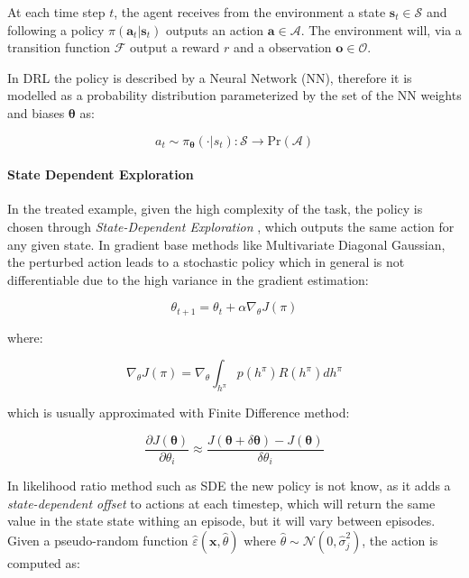 At each time step $t$, the agent receives from the environment a state $\mathbf{s}_t \in \mathcal{S}$ and following a policy $\pi (\mathbf{a}_t | \mathbf{s}_t)$ outputs an action $\mathbf{a} \in \mathcal{A}$. The environment will, via a transition function $\mathcal{F}$ output a reward $r$ and a observation $\mathbf{o} \in \mathcal{O}$.

In \ac{DRL} the policy is described by a Neural Network (\ac{NN}), therefore it is modelled as a probability distribution parameterized by the set of the \ac{NN} weights and biases $\boldsymbol{\theta}$ as:

\begin{equation}
    a _t \sim \pi _{\boldsymbol{\theta}}(\cdot | s_t): \mathcal{S} \rightarrow \mathrm{Pr}(\mathcal{A})
\end{equation}

\paragraph{State Dependent Exploration} In the treated example, given the high complexity of the task, the policy is chosen through \textit{State-Dependent Exploration} \cite{daelemans_state-dependent_2008} \cite{raffin_smooth_2021}, which outputs the same action for any given state. In gradient base methods like Multivariate Diagonal Gaussian, the perturbed action leads to a stochastic policy which in general is not differentiable due to the high variance in the gradient estimation:

\begin{equation}
    \theta _{t+1} = \theta _t + \alpha \nabla _{\theta} J(\pi)
\end{equation}

where:

\begin{equation}
    \nabla _{\theta} J(\pi) = \nabla _{\theta} \int _{h ^{\pi}} p(h ^{\pi})R(h ^{\pi})dh ^{\pi}
\end{equation}

which is usually approximated with Finite Difference method:

\begin{equation}
    \label{eqn:finitediff}
    \frac{\partial J(\boldsymbol{\theta})}{\partial \theta _i} \approx \frac{J(\boldsymbol{\theta} + \delta \boldsymbol{\theta}) - J(\boldsymbol{\theta})}{\delta \theta _i}
\end{equation}

In likelihood ratio method such as \ac{SDE} the new policy is not know, as it adds a \textit{state-dependent offset} to actions at each timestep, which will return the same value in the state state withing an episode, but it will vary between episodes. Given a pseudo-random function $\hat{\varepsilon}(\mathbf{x}, \hat{\theta})$ where $\hat{\theta} \sim \mathcal{N}(0, \hat{\sigma} _j ^2)$, the action is computed as:

